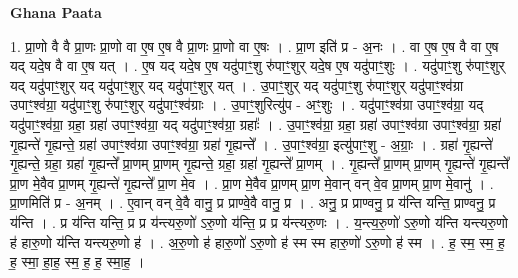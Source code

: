 \documentclass[17pt]{extarticle}
\begin{document}
\textbf{Ghana Paata } \newline

1. प्रा॒णो वै वै प्रा॒णः प्रा॒णो वा ए॒ष ए॒ष वै प्रा॒णः प्रा॒णो वा ए॒षः । . प्रा॒ण इति॑ प्र - अ॒नः । . वा ए॒ष ए॒ष वै वा ए॒ष यद् यदे॒ष वै वा ए॒ष यत् । . ए॒ष यद् यदे॒ष ए॒ष यदु॑पाꣳ॒॒शु रु॑पाꣳ॒॒शुर् यदे॒ष ए॒ष यदु॑पाꣳ॒॒शुः । . यदु॑पाꣳ॒॒शु रु॑पाꣳ॒॒शुर् यद् यदु॑पाꣳ॒॒शुर् यद् यदु॑पाꣳ॒॒शुर् यद् यदु॑पाꣳ॒॒शुर् यत् । . उ॒पाꣳ॒॒शुर् यद् यदु॑पाꣳ॒॒शु रु॑पाꣳ॒॒शुर् यदु॑पाꣳ॒॒श्व॑ग्रा उपाꣳ॒॒श्व॑ग्रा॒ यदु॑पाꣳ॒॒शु रु॑पाꣳ॒॒शुर् यदु॑पाꣳ॒॒श्व॑ग्राः । . उ॒पाꣳ॒॒शुरित्यु॑प - अꣳ॒॒शुः । . यदु॑पाꣳ॒॒श्व॑ग्रा उपाꣳ॒॒श्व॑ग्रा॒ यद् यदु॑पाꣳ॒॒श्व॑ग्रा॒ ग्रहा॒ ग्रहा॑ उपाꣳ॒॒श्व॑ग्रा॒ यद् यदु॑पाꣳ॒॒श्व॑ग्रा॒ ग्रहाः᳚ । . उ॒पाꣳ॒॒श्व॑ग्रा॒ ग्रहा॒ ग्रहा॑ उपाꣳ॒॒श्व॑ग्रा उपाꣳ॒॒श्व॑ग्रा॒ ग्रहा॑ गृ॒ह्यन्ते॑ गृ॒ह्यन्ते॒ ग्रहा॑ उपाꣳ॒॒श्व॑ग्रा उपाꣳ॒॒श्व॑ग्रा॒ ग्रहा॑ गृ॒ह्यन्ते᳚ । . उ॒पाꣳ॒॒श्व॑ग्रा॒ इत्यु॑पाꣳ॒॒शु - अ॒ग्राः॒ । . ग्रहा॑ गृ॒ह्यन्ते॑ गृ॒ह्यन्ते॒ ग्रहा॒ ग्रहा॑ गृ॒ह्यन्ते᳚ प्रा॒णम् प्रा॒णम् गृ॒ह्यन्ते॒ ग्रहा॒ ग्रहा॑ गृ॒ह्यन्ते᳚ प्रा॒णम् । . गृ॒ह्यन्ते᳚ प्रा॒णम् प्रा॒णम् गृ॒ह्यन्ते॑ गृ॒ह्यन्ते᳚ प्रा॒ण मे॒वैव प्रा॒णम् गृ॒ह्यन्ते॑ गृ॒ह्यन्ते᳚ प्रा॒ण मे॒व । . प्रा॒ण मे॒वैव प्रा॒णम् प्रा॒ण मे॒वान् वन् वे॒व प्रा॒णम् प्रा॒ण मे॒वानु॑ । . प्रा॒णमिति॑ प्र - अ॒नम् । . ए॒वान् वन् वे॒वै वानु॒ प्र प्राण्वे॒वै वानु॒ प्र । . अनु॒ प्र प्राण्वनु॒ प्र य॑न्ति यन्ति॒ प्राण्वनु॒ प्र य॑न्ति । . प्र य॑न्ति यन्ति॒ प्र प्र य॑न्त्यरु॒णो॑ ऽरु॒णो य॑न्ति॒ प्र प्र य॑न्त्यरु॒णः । . य॒न्त्य॒रु॒णो॑ ऽरु॒णो य॑न्ति यन्त्यरु॒णो ह॑ हारु॒णो य॑न्ति यन्त्यरु॒णो ह॑ । . अ॒रु॒णो ह॑ हारु॒णो॑ ऽरु॒णो ह॑ स्म स्म हारु॒णो॑ ऽरु॒णो ह॑ स्म । . ह॒ स्म॒ स्म॒ ह॒ ह॒ स्मा॒ हा॒ह॒ स्म॒ ह॒ ह॒ स्मा॒ह॒ । \newline
\end{document}
